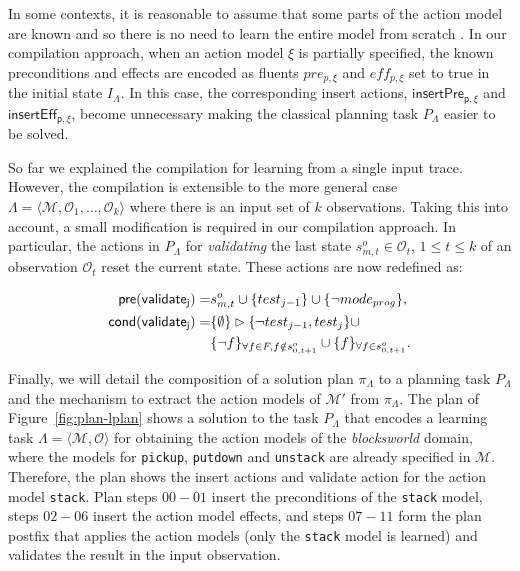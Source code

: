 \documentclass[runningheads]{llncs}
\newcommand{\tup}[1]{{\langle #1 \rangle}}
\newcommand{\pre}{\mathsf{pre}}     %
\newcommand{\cond}{\mathsf{cond}}   %
\begin{document}
In some contexts, it is reasonable to assume that some parts of the action model are known and so there is no need to learn the entire model from scratch \cite{ZhuoNK13}. In our compilation approach, when an action model $\xi$ is partially specified, the known preconditions and effects are encoded as fluents $pre_{p,\xi}$ and $eff_{p,\xi}$ set to true in the initial state $I_{\Lambda}$. In this case, the corresponding insert actions, $\mathsf{insertPre_{p,\xi}}$ and $\mathsf{insertEff_{p,\xi}}$, become unnecessary making the classical planning task $P_{\Lambda}$ easier to be solved.

So far we explained the compilation for learning from a single input trace. However, the compilation is extensible to the more general case $\Lambda=\tup{\mathcal{M},\mathcal{O}_1,\ldots,\mathcal{O}_k}$ where there is an input set of $k$ observations. Taking this into account, a small modification is required in our compilation approach. In particular, the actions in $P_{\Lambda}$ for {\em validating} the last state $s_{m,t}^o\in \mathcal{O}_t$, {\tt\small $1\leq t\leq k$} of an observation $\mathcal{O}_t$ reset the current state. These actions are now redefined as:

\begin{small}
	\begin{align*}
	\hspace*{7pt}\pre(\mathsf{validate_{j}})=&s_{m,t}^o\cup\{test_{j-1}\}\cup  
	\{\neg mode_{prog}\},\\
	\cond(\mathsf{validate_{j}})=&\{\emptyset\}\rhd\{\neg  
	test_{j-1},test_j\} \cup \\
	&\{\neg f\}_{\forall f\in F, f \notin s_{0,t+1}^o}\cup \{f\}_{\forall  
		f\in s_{0,t+1}^o}.
	\end{align*}
\end{small}

Finally, we will detail the composition of a solution plan $\pi_\Lambda$ to a planning task $P_\Lambda$ and the mechanism to extract the action models of $\mathcal{M}'$ from $\pi_\Lambda$. The plan of Figure~\ref{fig:plan-lplan} shows a solution to the task $P_{\Lambda}$ that encodes a learning task $\Lambda=\tup{\mathcal{M},\mathcal{O}}$ for obtaining the action models of the {\em blocksworld} domain, where the models for {\tt\small pickup}, {\tt\small putdown} and {\tt\small unstack} are already specified in $\mathcal{M}$. Therefore, the plan shows the insert actions and validate action for the action model {\tt\small stack}. Plan steps $00-01$ insert the preconditions of the {\tt\small stack} model, steps $02-06$ insert the action model effects, and steps $07-11$ form the plan postfix that applies the action models (only the {\tt\small stack} model is learned) and validates the result in the input observation.
\end{document}
